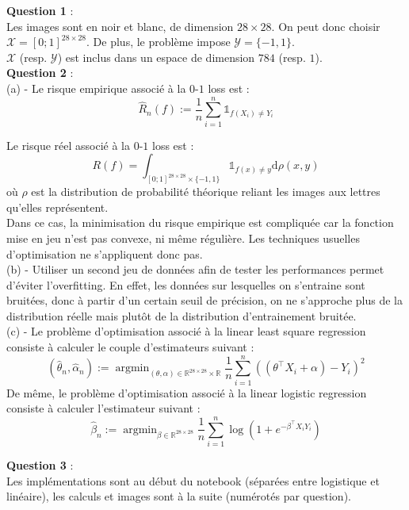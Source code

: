 \documentclass[11pt,a4paper]{article}
\DeclareMathOperator*{\argmin}{arg\min}
\begin{document}
\textbf{Question 1} : \\ Les images sont en noir et blanc, de dimension $28 \times 28$. On peut donc choisir $\mathcal{X}=[0;1]^{28\times 28}$. De plus, le problème impose $\mathcal{Y}=\{-1,1\}$.\\ $\mathcal{X}$ (resp. $\mathcal{Y}$) est inclus dans un espace de dimension $784$ (resp. $1$). \\

\textbf{Question 2} : \\
 (a) - Le risque empirique associé à la $0$-$1$ loss est : \[\widehat{R}_n(f) := \frac{1}{n} \sum_{i=1}^n\mathds{1}_{f(X_i)\neq Y_i}\]

Le risque réel associé à la $0$-$1$ loss est : \[R(f) = \int_{[0;1]^{28\times 28} \times \{-1,1\}} \mathds{1}_{f(x)\neq y}\mathrm{d}\rho(x,y) \] où $\rho$ est la distribution de probabilité théorique reliant les images aux lettres qu'elles représentent. \\

Dans ce cas, la minimisation du risque empirique est compliquée car la fonction mise en jeu n'est pas convexe, ni même régulière. Les techniques usuelles d'optimisation ne s'appliquent donc pas. \\

(b) - Utiliser un second jeu de données afin de tester les performances permet d'éviter l'overfitting. En effet, les données sur lesquelles on s'entraine sont bruitées, donc à partir d'un certain seuil de précision, on ne s'approche plus de la distribution réelle mais plutôt de la distribution d'entrainement bruitée. \\

(c) - Le problème d'optimisation associé à la linear least square regression consiste à calculer le couple d'estimateurs suivant : \[(\widehat{\theta}_n,\widehat{\alpha}_n ):= \argmin_{(\theta,\alpha) \in \mathbb{R}^{28\times 28}\times\mathbb{R}} \frac{1}{n}\sum_{i=1}^n((\theta^\top X_i + \alpha) -Y_i)^2\]
De même, le problème d'optimisation associé à la linear logistic regression consiste à calculer l'estimateur suivant :
\[\widehat{\beta}_n := \argmin_{\beta \in \mathbb{R}^{28\times 28}} \frac{1}{n}\sum_{i=1}^n \log(1 + e^{-\beta^\top X_i Y_i}) \]

\textbf{Question 3} : \\ Les implémentations sont au début du notebook (séparées entre logistique et linéaire), les calculs et images sont à la suite (numérotés par question). \\
\end{document}

